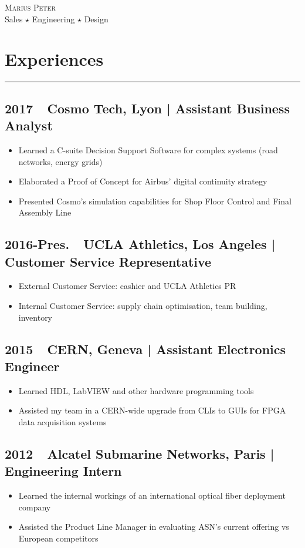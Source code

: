 \documentclass[12pt]{report}
\begin{document}
\begin{center}
    \huge \textsc{Marius Peter} \\
    \large Sales $\star$ Engineering $\star$ Design
\end{center}

\section*{Experiences}
\rule{\linewidth}{1pt}
\subsection*{2017~\textemdash~Cosmo Tech, Lyon | \textbf{Assistant Business Analyst}}
\begin{itemize}
    \item Learned a C-suite Decision Support Software for complex systems (road networks, energy grids)
    \item Elaborated a Proof of Concept for Airbus’ digital continuity strategy
    \item Presented Cosmo’s simulation capabilities for Shop Floor Control and Final Assembly Line
\end{itemize}

\subsection*{2016-Pres.~\textemdash~UCLA Athletics, Los Angeles | \textbf{Customer Service Representative}}
\begin{itemize}
    \item  External Customer Service: cashier and UCLA Athletics PR
    \item Internal Customer Service: supply chain optimisation, team building, inventory
\end{itemize}

\subsection*{2015~\textemdash~CERN, Geneva | \textbf{Assistant Electronics Engineer}}
\begin{itemize}
    \item Learned HDL, LabVIEW and other hardware programming tools
    \item Assisted my team in a CERN-wide upgrade from CLIs to GUIs for FPGA data acquisition systems
\end{itemize}

\subsection*{2012~\textemdash~Alcatel Submarine Networks, Paris | \textbf{Engineering Intern}}
\begin{itemize}
    \item Learned the internal workings of an international optical fiber deployment company
    \item Assisted the Product Line Manager in evaluating ASN's current offering vs European competitors
\end{itemize}
\end{document}
